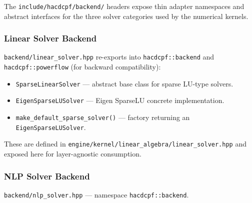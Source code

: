 The \texttt{include/hacdcpf/backend/} headers expose thin adapter namespaces
and abstract interfaces for the three solver categories used by the numerical
kernels.

\subsubsection{Linear Solver Backend}

\texttt{backend/linear\_solver.hpp} re-exports into \texttt{hacdcpf::backend}
and \texttt{hacdcpf::powerflow} (for backward compatibility):

\begin{itemize}
  \item \texttt{SparseLinearSolver} --- abstract base class for sparse LU-type solvers.
  \item \texttt{EigenSparseLUSolver} --- Eigen SparseLU concrete implementation.
  \item \texttt{make\_default\_sparse\_solver()} --- factory returning an \texttt{EigenSparseLUSolver}.
\end{itemize}

These are defined in \texttt{engine/kernel/linear\_algebra/linear\_solver.hpp}
and exposed here for layer-agnostic consumption.

\subsubsection{NLP Solver Backend}

\texttt{backend/nlp\_solver.hpp} --- namespace \texttt{hacdcpf::backend}.

